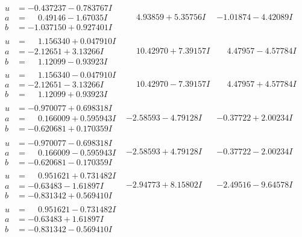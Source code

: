 \documentclass[1p]{elsarticle_modified}
\theoremstyle{definition}
\begin{document}
$$\begin{array}{c|c|c}
\begin{aligned}
u &= -0.437237 - 0.783767 I \\
a &= \phantom{-}0.49146 - 1.67035 I \\
b &= -1.037150 + 0.927401 I\end{aligned}
 & \phantom{-}4.93859 + 5.35756 I & -1.01874 - 4.42089 I \\ \hline\begin{aligned}
u &= \phantom{-}1.156340 + 0.047910 I \\
a &= -2.12651 + 3.13266 I \\
b &= \phantom{-}1.12099 - 0.93923 I\end{aligned}
 & \phantom{-}10.42970 + 7.39157 I & \phantom{-}4.47957 - 4.57784 I \\ \hline\begin{aligned}
u &= \phantom{-}1.156340 - 0.047910 I \\
a &= -2.12651 - 3.13266 I \\
b &= \phantom{-}1.12099 + 0.93923 I\end{aligned}
 & \phantom{-}10.42970 - 7.39157 I & \phantom{-}4.47957 + 4.57784 I \\ \hline\begin{aligned}
u &= -0.970077 + 0.698318 I \\
a &= \phantom{-}0.166009 + 0.595943 I \\
b &= -0.620681 + 0.170359 I\end{aligned}
 & -2.58593 - 4.79128 I & -0.37722 + 2.00234 I \\ \hline\begin{aligned}
u &= -0.970077 - 0.698318 I \\
a &= \phantom{-}0.166009 - 0.595943 I \\
b &= -0.620681 - 0.170359 I\end{aligned}
 & -2.58593 + 4.79128 I & -0.37722 - 2.00234 I \\ \hline\begin{aligned}
u &= \phantom{-}0.951621 + 0.731482 I \\
a &= -0.63483 - 1.61897 I \\
b &= -0.831342 + 0.569410 I\end{aligned}
 & -2.94773 + 8.15802 I & -2.49516 - 9.64578 I \\ \hline\begin{aligned}
u &= \phantom{-}0.951621 - 0.731482 I \\
a &= -0.63483 + 1.61897 I \\
b &= -0.831342 - 0.569410 I\end{aligned}

\end{array}$$
\end{document}
